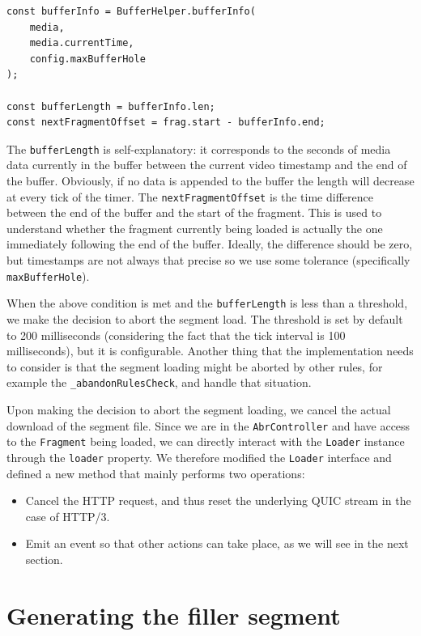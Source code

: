 \begin{verbatim}
const bufferInfo = BufferHelper.bufferInfo(
    media,
    media.currentTime,
    config.maxBufferHole
);

const bufferLength = bufferInfo.len;
const nextFragmentOffset = frag.start - bufferInfo.end;
\end{verbatim}

The \texttt{bufferLength} is self-explanatory: it corresponds to the seconds of media data currently in the buffer between the current video timestamp and the end of the buffer. Obviously, if no data is appended to the buffer the length will decrease at every tick of the timer. The \texttt{nextFragmentOffset} is the time difference between the end of the buffer and the start of the fragment. This is used to understand whether the fragment currently being loaded is actually the one immediately following the end of the buffer. Ideally, the difference should be zero, but timestamps are not always that precise so we use some tolerance (specifically \texttt{maxBufferHole}).

When the above condition is met and the \texttt{bufferLength} is less than a threshold, we make the decision to abort the segment load. The threshold is set by default to 200 milliseconds (considering the fact that the tick interval is 100 milliseconds), but it is configurable. Another thing that the implementation needs to consider is that the segment loading might be aborted by other rules, for example the \texttt{\_abandonRulesCheck}, and handle that situation.

Upon making the decision to abort the segment loading, we cancel the actual download of the segment file. Since we are in the \texttt{AbrController} and have access to the \texttt{Fragment} being loaded, we can directly interact with the \texttt{Loader} instance through the \texttt{loader} property. We therefore modified the \texttt{Loader} interface and defined a new method that mainly performs two operations:

\begin{itemize}
    \item Cancel the HTTP request, and thus reset the underlying QUIC stream in the case of HTTP/3.
    \item Emit an event so that other actions can take place, as we will see in the next section.
\end{itemize}

\section{Generating the filler segment}
\label{sec:improvements/filler}

